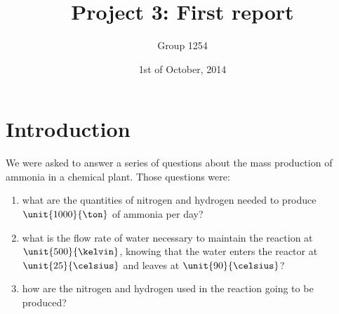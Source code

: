 \documentclass[a4paper,12pt, oneside]{report}
\title{Project 3: First report}
\author{Group 1254}
\date{1st of October, 2014}
\begin{document}
\maketitle

\tableofcontents

\section*{Introduction}

We were asked to answer a series of questions about the mass production of ammonia in a chemical plant. Those questions were:
\begin{enumerate}
 \item what are the quantities of nitrogen and hydrogen needed to produce $\unit{1000}{\ton}$ of ammonia per day?
 \item what is the flow rate of water necessary to maintain the reaction at $\unit{500}{\kelvin}$, knowing that the water enters the reactor at $\unit{25}{\celsius}$ and leaves at  $\unit{90}{\celsius}$?
 \item how are the nitrogen and hydrogen used in the reaction going to be produced?
\end{enumerate}
\end{document}

